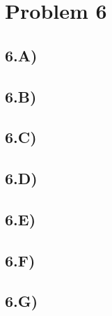 \section{Problem 6}
\subsection{6.A)}
\subsection{6.B)}
\subsection{6.C)}
\subsection{6.D)}
\subsection{6.E)}
\subsection{6.F)}
\subsection{6.G)}